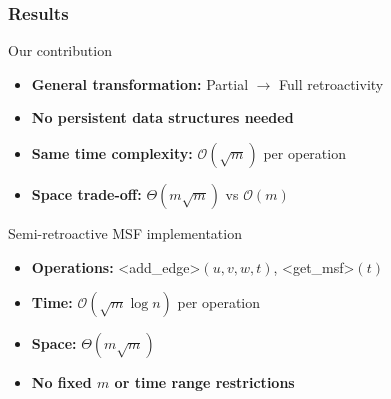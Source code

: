\documentclass[fleqn]{beamer}
\newcommand{\Oh}{\mathcal{O}}
\def\texttt#1{<#1>}%
\begin{document}
\begin{frame}
    \frametitle{Results}
    
    \begin{block}{Our contribution}
        \begin{itemize}
        \item \textbf{General transformation:} Partial $\rightarrow$ Full retroactivity \vfill
        \item \textbf{No persistent data structures needed} \vfill
        \item \textbf{Same time complexity:} $\Oh(\sqrt{m})$ per operation \vfill
        \item \textbf{Space trade-off:} $\Theta(m\sqrt{m})$ vs $\Oh(m)$ \vfill
        \end{itemize}
    \end{block} \pause
    
    \begin{block}{Semi-retroactive MSF implementation}
        \begin{itemize}
        \item \textbf{Operations:} \texttt{add\_edge}$(u,v,w,t)$, \texttt{get\_msf}$(t)$ \vfill
        \item \textbf{Time:} $\Oh(\sqrt{m}\log n)$ per operation \vfill
        \item \textbf{Space:} $\Theta(m\sqrt{m})$ \vfill
        \item \textbf{No fixed $m$ or time range restrictions} \vfill
        \end{itemize}
    \end{block}
\end{frame}
\end{document}
